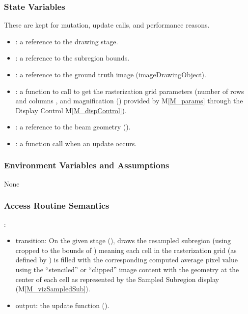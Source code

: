 \documentclass[12pt, titlepage]{article}
\newcommand{\mref}[1]{M\ref{#1}}
\newcommand{\mrefp}[1]{(\mref{#1})}
\begin{document}
\subsubsection{State Variables}
These are kept for mutation, update calls, and performance reasons.
\begin{itemize}
  \item {}: a reference to the drawing stage.
  \item {}: a reference to the subregion bounds.
  \item {}: a reference to the ground truth image (imageDrawingObject).
  \item {}: a function to call to get the rasterization
    grid parameters (number of rows  and columns ,
    and magnification () 
    provided by \mref{M_params}
    through the Display Control \mref{M_dispControl}).
  \item {}: a reference to the beam geometry ().
  \item {}: a function call when an update occurs.
\end{itemize}

\subsubsection{Environment Variables and Assumptions}
None

\subsubsection{Access Routine Semantics}

\noindent {}:
\begin{itemize}
\item transition: On the given stage (), draws the resampled subregion
  (using  cropped to the bounds of )
  meaning each cell in the rasterization grid (as defined by )
  is filled with the corresponding computed average pixel value using
  the ``stenciled'' or ``clipped'' image content with the  geometry
  at the center of each cell as represented by the Sampled Subregion
  display \mrefp{M_vizSampledSub}.
\item output: the update function ().
\end{itemize}
\end{document}

